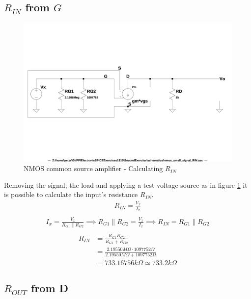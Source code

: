 \documentclass[10pt,a4paper]{book}
\begin{document}
\subsection{$R_{IN}$ from $G$}

\begin{figure}[h]
  \centering
  \includegraphics[width=12cm]{schematics/nmos_small_signal_RIN.jpg}
  \caption{NMOS common source amplifier - Calculating $R_{IN}$}
  \label{nmos_pi_RIN}
\end{figure}

Removing the signal, the load and applying a test voltage source as in figure \ref{nmos_pi_RIN} it is possible to calculate the input's resistance $R_{IN}$.\\

\begin{align}
R_{IN} = \frac{V_x}{I_x}\\
\end{align}
\begin{align}
I_x = \frac{V_x}{R_{G1} \parallel R_{G2}} \implies R_{G1} \parallel R_{G2} = \frac{V_x}{I_x}
\implies R_{IN} = R_{G1} \parallel R_{G2}\\
\end{align}
\begin{align}
R_{IN} &= \frac{R_{G1} R_{G2}}{R_{G1} + R_{G2}}\\
&= \frac{2.19550 M\Omega \cdot 1097752\Omega}{2.19550 M\Omega + 1097752\Omega}\\
&= 733.16756k\Omega \simeq 733.2k\Omega
\end{align}

\subsection{$R_{OUT}$ from D}
\end{document}
